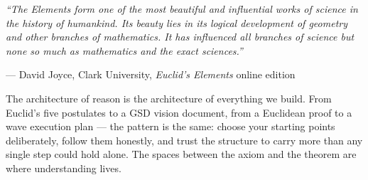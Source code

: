 \documentclass[11pt,letterpaper]{article}
\begin{document}
\vspace{1cm}

\begin{quotebox}
\textit{``The \textit{Elements} form one of the most beautiful and influential works of science in the history of humankind. Its beauty lies in its logical development of geometry and other branches of mathematics. It has influenced all branches of science but none so much as mathematics and the exact sciences.''}

\vspace{0.5em}

\hfill --- David Joyce, Clark University, \textit{Euclid's Elements} online edition

\vspace{1em}

The architecture of reason is the architecture of everything we build. From Euclid's five postulates to a GSD vision document, from a Euclidean proof to a wave execution plan --- the pattern is the same: choose your starting points deliberately, follow them honestly, and trust the structure to carry more than any single step could hold alone. The spaces between the axiom and the theorem are where understanding lives.
\end{quotebox}
\end{document}
